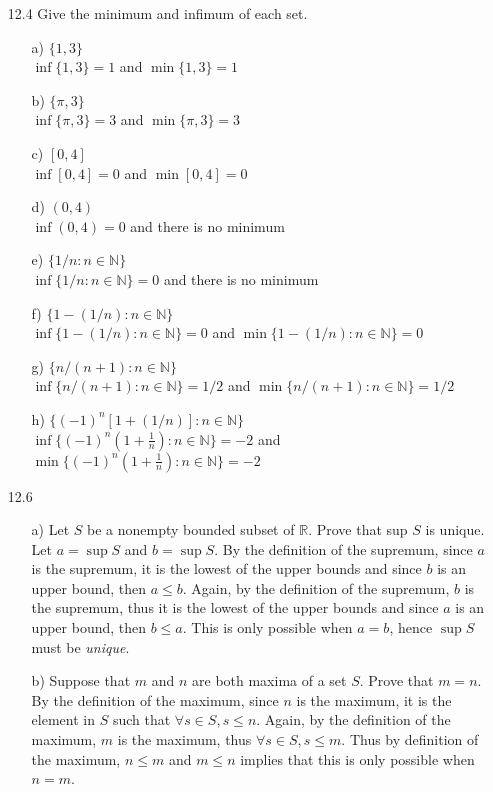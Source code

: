 \documentclass[12pt]{article}
\begin{document}
\begin{enumerate}
\item[12.4] Give the minimum and infimum of each set.
\begin{enumerate}
\item[a)] $\{ 1, 3 \}$ \\
$\inf \{1, 3\} = 1$ and $\min \{1, 3\} = 1$
\item[b)] $\{ \pi , 3 \}$ \\
$\inf \{\pi, 3\} = 3$ and $\min \{\pi, 3\} = 3$
\item[c)] $[0, 4]$ \\
$\inf [0, 4] = 0$ and $\min [0, 4] = 0$
\item[d)] $(0, 4)$ \\
$\inf (0, 4) = 0$ and there is no minimum
\item[e)] $\{ 1/n : n \in \mathbb{N} \}$ \\
$\inf \{1/n : n\in \mathbb{N}\} = 0$ and there is no minimum
\item[f)] $\{ 1 - (1/n) : n \in \mathbb{N} \}$ \\
$\inf \{1 - (1/n) : n\in \mathbb{N}\} = 0$ and $\min \{1 - (1/n) : n\in \mathbb{N}\} = 0$
\item[g)] $\{ n/(n + 1) : n \in \mathbb{N} \}$ \\
$\inf \{n/(n + 1) : n\in \mathbb{N}\} = 1/2$ and $\min \{n/(n + 1) : n\in \mathbb{N}\} = 1/2$
\item[h)] $\{ (-1)^n[1 + (1/n)] : n \in \mathbb{N} \}$ \\
$\inf \{(-1)^n \left(1 + \frac{1}{n}\right) : n \in \mathbb{N}\} = -2$ and 
$\min \{(-1)^n \left(1 + \frac{1}{n}\right) : n \in \mathbb{N}\} = -2$
\end{enumerate}

\item[12.6] 
\begin{enumerate}
\item[a)] Let $S$ be a nonempty bounded subset of $\mathbb{R}$. Prove that sup $S$ is unique. \\
Let $a = \sup S$ and $b = \sup S$. By the definition of the supremum, since $a$ is the supremum, it is the lowest of the upper bounds and since $b$ is an upper bound, then $a \leq b$. Again, by the definition of the supremum, $b$ is the supremum, thus it is the lowest of the upper bounds and since $a$ is an upper bound, then $b \leq a$. This is only possible when $a = b$, hence $\sup S$ must be \emph{unique}.
\item[b)] Suppose that $m$ and $n$ are both maxima of a set $S$. Prove that $m = n$. \\
By the definition of the maximum, since $n$ is the maximum, it is the element in $S$ such that
$\forall s \in S, s \leq n$. Again, by the definition of the maximum, $m$ is the maximum, 
thus $\forall s \in S, s \leq m$. Thus by definition of the maximum, $n \leq m$ and $m \leq n$ implies that this is only possible when $n = m$.
\end{enumerate}

\end{enumerate}
\end{document}
